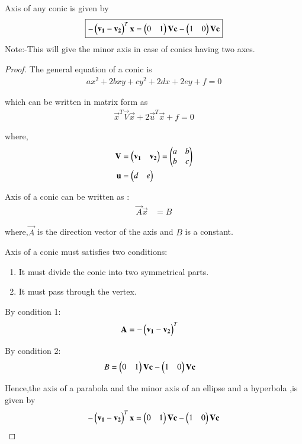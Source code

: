 \documentclass[journal,12pt,twocolumn]{IEEEtran}
\begin{document}
\begin{lemma}
Axis of any conic is given by
\begin{align}
    \boxed{-\begin{pmatrix}\mathbf{v_1}-\mathbf{v_2}\end{pmatrix}^T\mathbf{x} = \begin{pmatrix}0 & 1\end{pmatrix}\mathbf{V}\mathbf{c} - \begin{pmatrix}1 & 0\end{pmatrix}\mathbf{V}\mathbf{c}}
\end{align}
Note:-This will give the minor axis in case of conics having two axes.
\end{lemma}
\begin{proof}
The general equation of a conic is
\begin{align}
  ax^2+2bxy+cy^2+2dx+2ey+f=0
\end{align}

which can be written in matrix form as
\begin{align}
    \vec{x}^T\vec{V}\vec{x} + 2\vec{u}^T\vec{x} + f =0
\end{align}

where,
\begin{align}
    \mathbf{V} &= \begin{pmatrix}\mathbf{v_1} & \mathbf{v_2}\end{pmatrix}=\begin{pmatrix}a & b \\ b& c\end{pmatrix}
    \\
    \mathbf{u} &= \begin{pmatrix}d & e\end{pmatrix}
\end{align}

Axis of a conic can be written as :
\begin{align}
    \vec{A}\vec{x} &= B
\end{align}

where,$\vec{A}$ is the direction vector of the axis and $B$ is a constant.

Axis of a conic must satisfies two conditions:
\begin{enumerate}
    \item  It must divide the conic into two symmetrical parts. 
    \item  It must pass through the vertex.
\end{enumerate}

By condition 1:
\begin{align}
    \mathbf{A} &= -\begin{pmatrix}\mathbf{v_1}-\mathbf{v_2}\end{pmatrix}^T
\end{align}

By condition 2:
\begin{align}
    B &= \begin{pmatrix}0 & 1\end{pmatrix}\mathbf{V}\mathbf{c} - \begin{pmatrix}1 & 0\end{pmatrix}\mathbf{V}\mathbf{c}
\end{align}

Hence,the axis of a parabola and the minor axis of an ellipse and a hyperbola ,is given by
\begin{align}
    -\begin{pmatrix}\mathbf{v_1}-\mathbf{v_2}\end{pmatrix}^T\mathbf{x} = \begin{pmatrix}0 & 1\end{pmatrix}\mathbf{V}\mathbf{c} - \begin{pmatrix}1 & 0\end{pmatrix}\mathbf{V}\mathbf{c}
\end{align}
\end{proof}
\end{document}
